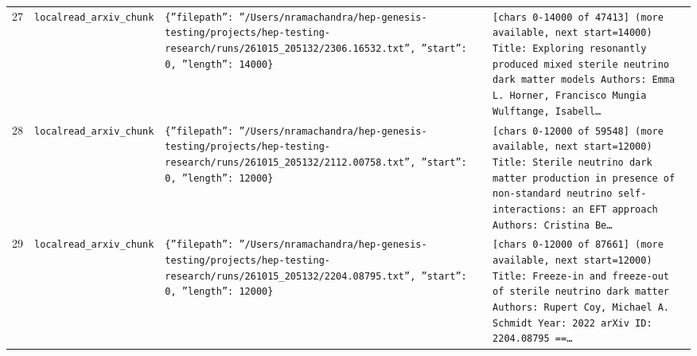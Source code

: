 \documentclass[11pt,a4paper]{article}
\begin{document}
\begin{longtable}{@{}p{}p{}p{}p{}@{}}
27 & \texttt{local}\newline\texttt{read\_\allowbreak{}arxiv\_\allowbreak{}chunk} & \texttt{\{''filepath'':\allowbreak{} ''/\allowbreak{}Users/\allowbreak{}nramachandra/\allowbreak{}hep-genesis-testing/\allowbreak{}projects/\allowbreak{}hep-testing-research/\allowbreak{}runs/\allowbreak{}261015\_\allowbreak{}205132/\allowbreak{}2306.16532.txt'',\allowbreak{} ''start'':\allowbreak{} 0,\allowbreak{} ''length'':\allowbreak{} 14000\}\allowbreak{}} & \texttt{[chars 0-14000 of 47413]\allowbreak{} (more available,\allowbreak{} next start=\allowbreak{}14000)\allowbreak{}  Title:\allowbreak{} Exploring resonantly produced mixed sterile neutrino dark matter models Authors:\allowbreak{} Emma L. Horner,\allowbreak{} Francisco Mungia Wulftange,\allowbreak{} Isabell\ldots{}\allowbreak{}} \\
28 & \texttt{local}\newline\texttt{read\_\allowbreak{}arxiv\_\allowbreak{}chunk} & \texttt{\{''filepath'':\allowbreak{} ''/\allowbreak{}Users/\allowbreak{}nramachandra/\allowbreak{}hep-genesis-testing/\allowbreak{}projects/\allowbreak{}hep-testing-research/\allowbreak{}runs/\allowbreak{}261015\_\allowbreak{}205132/\allowbreak{}2112.00758.txt'',\allowbreak{} ''start'':\allowbreak{} 0,\allowbreak{} ''length'':\allowbreak{} 12000\}\allowbreak{}} & \texttt{[chars 0-12000 of 59548]\allowbreak{} (more available,\allowbreak{} next start=\allowbreak{}12000)\allowbreak{}  Title:\allowbreak{} Sterile neutrino dark matter production in presence of non-standard neutrino self-interactions:\allowbreak{} an EFT approach Authors:\allowbreak{} Cristina Be\ldots{}\allowbreak{}} \\
29 & \texttt{local}\newline\texttt{read\_\allowbreak{}arxiv\_\allowbreak{}chunk} & \texttt{\{''filepath'':\allowbreak{} ''/\allowbreak{}Users/\allowbreak{}nramachandra/\allowbreak{}hep-genesis-testing/\allowbreak{}projects/\allowbreak{}hep-testing-research/\allowbreak{}runs/\allowbreak{}261015\_\allowbreak{}205132/\allowbreak{}2204.08795.txt'',\allowbreak{} ''start'':\allowbreak{} 0,\allowbreak{} ''length'':\allowbreak{} 12000\}\allowbreak{}} & \texttt{[chars 0-12000 of 87661]\allowbreak{} (more available,\allowbreak{} next start=\allowbreak{}12000)\allowbreak{}  Title:\allowbreak{} Freeze-in and freeze-out of sterile neutrino dark matter Authors:\allowbreak{} Rupert Coy,\allowbreak{} Michael A. Schmidt Year:\allowbreak{} 2022 arXiv ID:\allowbreak{} 2204.08795  =\allowbreak{}=\allowbreak{}\ldots{}\allowbreak{}} \\

\end{longtable}
\end{document}
